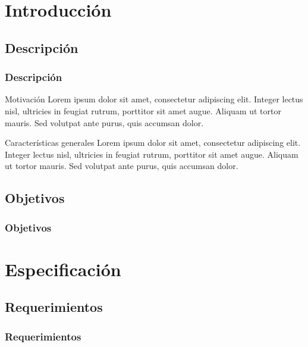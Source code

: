 \section{Introducción} 

\subsection{Descripción}
 
\begin{frame}
	\frametitle{Descripción}
	
		\begin{block}{Motivación}
			Lorem ipsum dolor sit amet, consectetur adipiscing elit. Integer lectus nisl, ultricies in feugiat rutrum, porttitor sit amet augue. Aliquam ut tortor mauris. Sed volutpat ante purus, quis accumsan dolor.
		\end{block}

		\begin{block}{Características generales}
			Lorem ipsum dolor sit amet, consectetur adipiscing elit. Integer lectus nisl, ultricies in feugiat rutrum, porttitor sit amet augue. Aliquam ut tortor mauris. Sed volutpat ante purus, quis accumsan dolor.
		\end{block}

\end{frame}

\subsection{Objetivos}
\begin{frame}
	\frametitle{Objetivos}

\end{frame}

\section{Especificación}

\subsection{Requerimientos}
\begin{frame}
	\frametitle{Requerimientos}

\end{frame}

